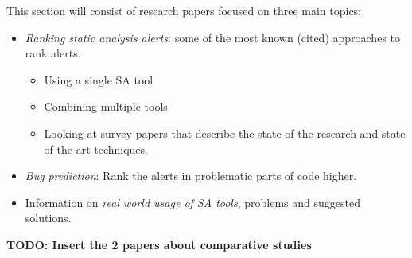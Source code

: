 \documentclass{article}
\begin{document}
This section will consist of research papers focused on three main topics: 
\begin{itemize}
    \item \textit{Ranking static analysis alerts}: some of the most known (cited) approaches to rank alerts.
    \begin{itemize}
        \item Using a single SA tool
        \item Combining multiple tools
        \item Looking at survey papers that describe the state of the research and state of the art techniques.
    \end{itemize}
    \item \textit{Bug prediction}: Rank the alerts in problematic parts of code higher.
    \item Information on \textit{real world usage of SA tools}, problems and suggested solutions.
\end{itemize}

\textbf{TODO: Insert the 2 papers about comparative studies}





\end{document}
